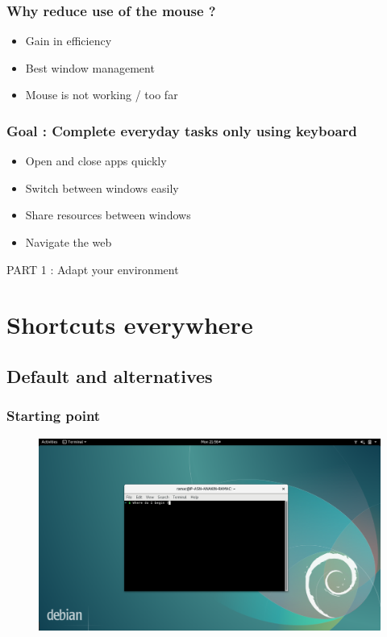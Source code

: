 \documentclass[aspectratio=169]{beamer}
\begin{document}
\begin{frame}
  \frametitle{Why reduce use of the mouse ?}
  \begin{itemize}
    \item Gain in efficiency
    \item Best window management
        \pause
    \item Mouse is not working / too far
  \end{itemize}
\end{frame}

\begin{frame}
  \frametitle{Goal : Complete everyday tasks only using keyboard}
  \begin{itemize}
    \item Open and close apps quickly
    \item Switch between windows easily
    \item Share resources between windows
    \item Navigate the web
  \end{itemize}
\end{frame}

%

\begin{frame}[c]
    \begin{center}
        \huge PART 1 : Adapt your environment
    \end{center}
\end{frame}

\section{Shortcuts everywhere}
\subsection{Default and alternatives}

\begin{frame}
 \frametitle{Starting point}
    \begin{figure}[h]
        \includegraphics[scale=0.23]{./images/starting_point.png}
    \end{figure}
\end{frame}
\end{document}
